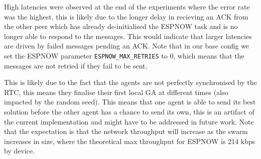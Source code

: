 \documentclass[conference]{IEEEtran}
\begin{document}
High latencies were observed at the end of the experiments where the error rate was the highest, this is likely due to the longer delay in recieving an ACK from the other peer which has already de-initialised the ESPNOW task and is no longer able to respond to the messages. This would indicate that larger latencies are driven by failed messages pending an ACK. Note that in our base config we set the ESPNOW parameter \texttt{ESPNOW\_MAX\_RETRIES} to 0, which means that the messages are not retried if they fail to be sent. 

This is likely due to the fact that the agents are not perfectly synchronised by the RTC, this means they finalise their first local GA at different times (also impacted by the random seed). This means that one agent is able to send its best solution before the other agent has a chance to send its own, this is an artifact of the current implementation and might have to be addressed in future work. Note that the expectation is that the network throughput will increase as the swarm increases in size, where the theoretical max throughput for ESPNOW is 214 kbps by device.\\

\newpage
\printbibliography
\end{document}

